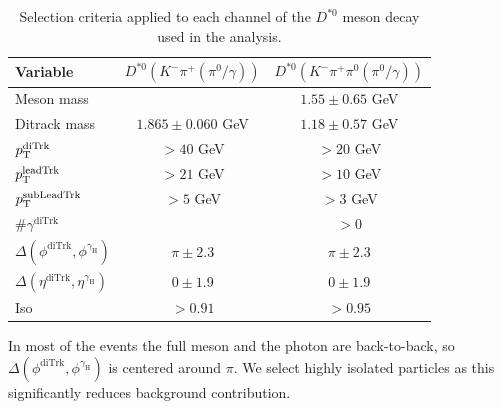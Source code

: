 \begin{table}[!ht]
    \centering
    \begin{tabular}{|l|c|c|}
        \hline
        \cellcolor{lightgray}Variable & \cellcolor{lightgray}$D^{*0}(K^{-}\pi^{+}{\scriptstyle(\pi^{0}/\gamma)})$ & \cellcolor{lightgray}$D^{*0}(K^{-}\pi^{+}\pi^{0}{\scriptstyle(\pi^{0}/\gamma)})$ \\ \hline
        Meson mass                                              &                   &$1.55\pm 0.65$ GeV  \\
        Ditrack mass                                            &$1.865\pm0.060$ GeV&$1.18\pm 0.57$ GeV  \\
        $p_\text{T}^{\text{diTrk}}$                                    &$>40$ GeV          &$>20$ GeV           \\
        $p_\text{T}^{\text{leadTrk}}$                                  &$>21$ GeV          &$>10$ GeV           \\
        $p_\text{T}^{\text{subLeadTrk}}$                               &$>5$ GeV           &$>3$ GeV           \\
        $\#\gamma^{\text{diTrk}}$                               &                   &$>0$               \\
        $\Delta(\phi^{\text{diTrk}}, \phi^{\gamma_\text{H}})$   &$\pi\pm2.3$        &$\pi\pm2.3$        \\
        $\Delta(\eta^{\text{diTrk}}, \eta^{\gamma_\text{H}})$   &$0\pm1.9$          &$0\pm1.9$           \\
        Iso                                                     &$>0.91$            &$>0.95$             \\
        \hline
        \end{tabular}
    \caption{Selection criteria applied to each channel of the $D^{*0}$ meson decay used in the analysis.}
    \label{tab:meson_selection_2}
\end{table}

In most of the events the full meson and the photon are back-to-back, so $\Delta(\phi^{\text{diTrk}}, \phi^{\gamma_\text{H}})$ is centered around $\pi$. We select highly isolated particles as this significantly reduces background contribution.


